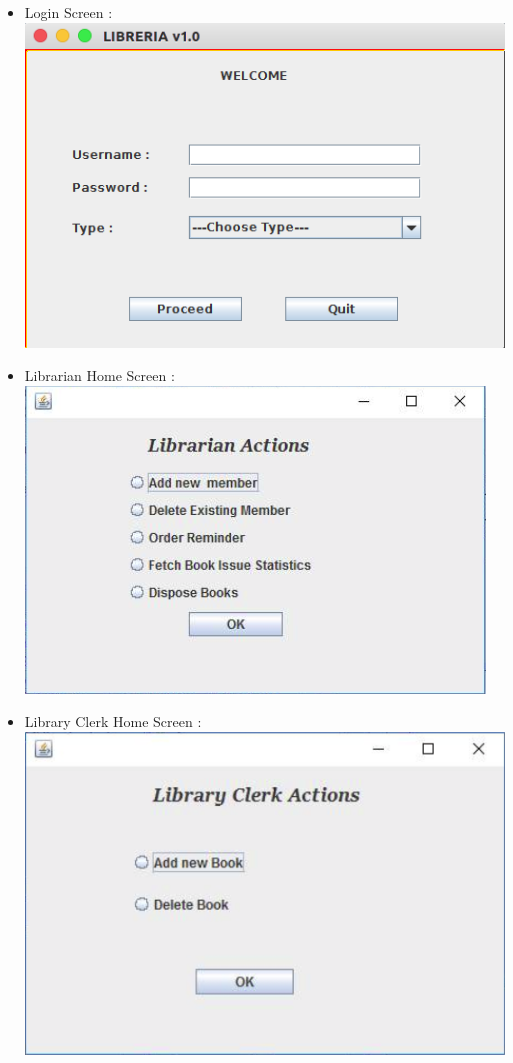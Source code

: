\documentclass[a4paper]{article}
\begin{document}
\begin{itemize}
\item Login Screen : \\
\includegraphics[scale=0.5]{images/login.png}
\item Librarian Home Screen : \\
\includegraphics[scale=0.5]{images/librarian.png}
\item Library Clerk Home Screen : \\
\includegraphics[scale=0.5]{images/clerk.png}

\end{itemize}
\end{document}
